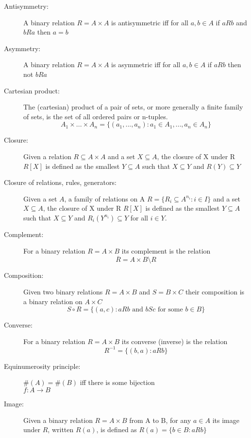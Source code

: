 \documentclass[12pt]{article}
\begin{document}
\begin{description}
\item[Antisymmetry:] A binary relation $R = A \times A$ is antisymmetric iff for all $a,b \in A $ if $aRb$ and $bRa$ then $a = b$

\item[Asymmetry:] A binary relation $R = A \times A$ is asymmetric iff for all $a,b \in A $ if $aRb$ then not $bRa$

\item[Cartesian product:] The (cartesian) product of a pair of sets, or more generally a finite family of sets, is the set of all ordered pairs or n-tuples. \[A_1 \times ... \times A_n = \{(a_1 , ... , a_n): a_1 \in A_1, ... , a_n \in A_n\}\]

\item[Closure:] Given a relation $R \subseteq A \times A$ and a set $X \subseteq A$, the closure of X under R $R[X]$ is defined as the smallest $Y \subseteq A$ such that $X \subseteq Y$ and $R(Y) \subseteq Y$

\item[Closure of relations, rules, generators:] Given a set $A$, a family of relations on A $R = \{R_i \subseteq A^{n_i}: i \in I\}$ and a set $X \subseteq A$, the closure of X under R $R[X]$ is defined as the smallest $Y \subseteq A$ such that $X \subseteq Y$ and $R_i (Y^{n_i})\subseteq Y$ for all $i \in Y$.

\item[Complement:] For a binary relation $R = A \times B$ its complement is the relation 
\[ \overline{R} = A \times B \textrm{\textbackslash} R\]

\item[Composition:] Given two binary relations $R = A \times B$  and $S = B \times C$ their composition is a binary relation on  $A \times C$ \[ S \circ R = \{(a,c): aRb  \textrm{ and } bSc \textrm{ for some } b \in B\}\]

\item[Converse:] For a binary relation $R = A \times B$ its converse (inverse) is the relation \[ R^{-1} = \{(b,a): aRb\}\]

\item[Equinumerosity principle:] $\#(A) = \#(B)$ iff there is some bijection \\$f: A \to B$

\item[Image:] Given a binary relation $R = A \times B$ from A to B, for any $a \in A$ its image under $R$, written $R(a)$, is defined as $R(a) = \{b \in B : aRb\}$


\end{description}
\end{document}
